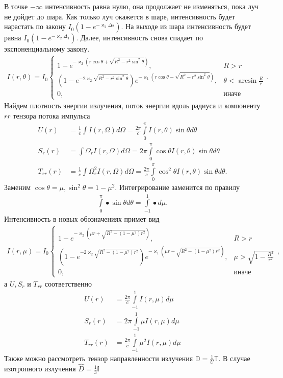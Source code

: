 В точке $-\infty$ интенсивность равна нулю, она продолжает не изменяться, пока луч не дойдет до шара. Как только луч окажется в шаре, интенсивность
будет нарастать по закону \mbox{$I_0(1-e^{-\varkappa_2 \Delta s})$}. На выходе из шара интенсивность будет равна 
\mbox{$I_0(1-e^{-\varkappa_2 \Delta_1})$}. Далее, интенсивность снова спадает 
по экспоненциальному закону.
\begin{align*}
I(r,\theta) = I_0
\begin{cases}
1-e^{-\varkappa_2 \left(r \cos \theta + \sqrt{R^2 - r^2 \sin^2 \theta}\right)},&R > r\\
\left(1-e^{-2\varkappa_2\sqrt{R^2 - r^2 \sin^2 \theta}}\right)
e^{-\varkappa_1 \left(r \cos \theta - \sqrt{R^2 - r^2 \sin^2 \theta}\right)},&\theta < \arcsin \frac{R}{r}\\
0,&\text{иначе}
\end{cases}.
\end{align*}
Найдем плотность энергии излучения, поток энергии вдоль радиуса и компоненту $rr$ тензора потока импульса
\begin{align*}
U(r) &= \frac{1}{c} \int\limits I(r,\Omega) d\Omega = \frac{2\pi}{c} \int\limits_0^\pi I(r, \theta) \sin \theta d\theta\\
S_r(r) &= \int\limits \Omega_r I(r,\Omega) d\Omega = 2\pi \int\limits_0^\pi \cos \theta I(r, \theta) \sin \theta d\theta\\
T_{rr}(r) &= \frac{1}{c} \int\limits \Omega_r^2 I(r,\Omega) d\Omega = \frac{2\pi}{c} \int\limits_0^\pi \cos^2 \theta I(r, \theta) \sin \theta d\theta.
\end{align*}
Заменим $\cos \theta = \mu, \sin^2 \theta = 1-\mu^2$. Интегрирование заменится по правилу
\begin{align*}
\int\limits_0^\pi \bullet \sin \theta d\theta = \int\limits_{-1}^1 \bullet d\mu.
\end{align*}
Интенсивность в новых обозначениях примет вид
\begin{align*}
I(r,\mu) = I_0
\begin{cases}
1-e^{-\varkappa_2 \left(\mu r + \sqrt{R^2 - (1-\mu^2)r^2}\right)},&R > r\\
\left(1-e^{-2\varkappa_2\sqrt{R^2 - (1-\mu^2)r^2}}\right)
e^{-\varkappa_1 \left(\mu r- \sqrt{R^2 - (1-\mu^2)r^2}\right)},&\mu > \sqrt{1-\frac{R^2}{r^2}}\\
0,&\text{иначе}
\end{cases},
\end{align*}
а $U, S_r$ и $T_{rr}$ соответственно
\begin{align*}
U(r) &= \frac{2\pi}{c} \int\limits_{-1}^{1} I(r, \mu) d\mu\\
S_r(r) &= 2\pi \int\limits_{-1}^1 \mu I(r, \mu) d\mu\\
T_{rr}(r) &= \frac{2\pi}{c} \int\limits_{-1}^1 \mu^2 I(r, \mu) d\mu
\end{align*}
Также можно рассмотреть тензор направленности излучения $\mathbb D = \frac{1}{U} \mathbb{T}$. В случае изотропного излучения $\hat D = \frac{1}{3}\mathbb I$

